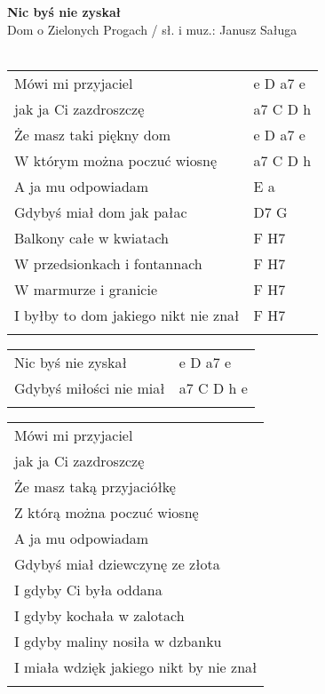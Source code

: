 \documentclass[a5paper]{article}
\begin{document}


\noindent
\fontsize{12pt}{15pt}\selectfont
\textbf{Nic byś nie zyskał} \\
\fontsize{8pt}{10pt}\selectfont
Dom o Zielonych Progach / sł. i muz.: Janusz Saługa \\ \\
\fontsize{10pt}{12pt}\selectfont
{}
\begin{tabular}{@{}p{8.00cm}p{3cm}@{}}
\noindent
Mówi mi przyjaciel & e D a7 e \\
jak ja Ci zazdroszczę & a7 C D h \\
Że masz taki piękny dom	& e D a7 e \\
W którym można poczuć wiosnę & a7 C D h \\
A ja mu odpowiadam & E a \\
Gdybyś miał dom jak pałac & D7 G \\
Balkony całe w kwiatach & F H7 \\
W przedsionkach i fontannach & F H7 \\
W marmurze i granicie & F H7 \\
I byłby to dom jakiego nikt nie znał & F H7 \\ \\
\end{tabular}

\noindent
\begin{tabular}{@{}p{7.00cm}p{3cm}@{}}
Nic byś nie zyskał & e D a7 e \\
Gdybyś miłości nie miał & a7 C D h e \\ \\
\end{tabular}

\noindent
\begin{tabular}{@{}p{8.00cm}@{}}
Mówi mi przyjaciel \\
jak ja Ci zazdroszczę \\
Że masz taką przyjaciółkę \\
Z którą można poczuć wiosnę \\
A ja mu odpowiadam \\
Gdybyś miał dziewczynę ze złota \\
I gdyby Ci była oddana \\
I gdyby kochała w zalotach \\
I gdyby maliny nosiła w dzbanku \\
I miała wdzięk jakiego nikt by nie znał \\ \\
\end{tabular}
\end{document}
